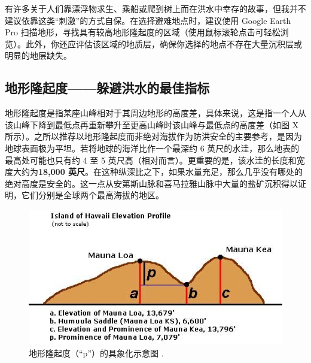 \documentclass[10pt,twocolumn,letterpaper]{article}
\begin{document}
有许多关于人们靠漂浮物求生、乘船或爬到树上而在洪水中幸存的故事，但我并不建议依靠这类“刺激”的方式自保。在选择避难地点时，建议使用 Google Earth Pro 扫描地形，寻找具有较高地形隆起度的区域（使用鼠标滚轮点击可轻松浏览）。此外，你还应评估该区域的地质层，确保你选择的地点不存在大量沉积层或明显的地层缺失。
\subsection{地形隆起度——躲避洪水的最佳指标}

地形隆起度是指某座山峰相对于其周边地形的高度差，具体来说，这是指一个人从该山峰下降到最低点再重新攀升至更高山峰时该山峰与最低点的高度差（如图 X 所示）。之所以推荐以地形隆起度而非绝对海拔作为防洪安全的主要参考，是因为地球表面极为平坦。若将地球的海洋比作一个最深约 6 英尺的水洼，那么地表的最高处可能也只有约 4 至 5 英尺高（相对而言）。更重要的是，该水洼的长度和宽度大约为\textbf{18,000 英尺}。在这种纵深比之下，如果水量充足，那么几乎没有哪处的绝对高度是安全的。这一点从安第斯山脉和喜马拉雅山脉中大量的盐矿沉积得以证明，它们分别是全球两个最高海拔的地区。

\begin{figure}[t]
\begin{center}
   \includegraphics[width=1\linewidth]{prominence.jpeg}
\end{center}
   \caption{地形隆起度（“p”）的具象化示意图 \cite{53}.}
\label{fig:11}
\label{fig:onecol}
\end{figure}
\end{document}
